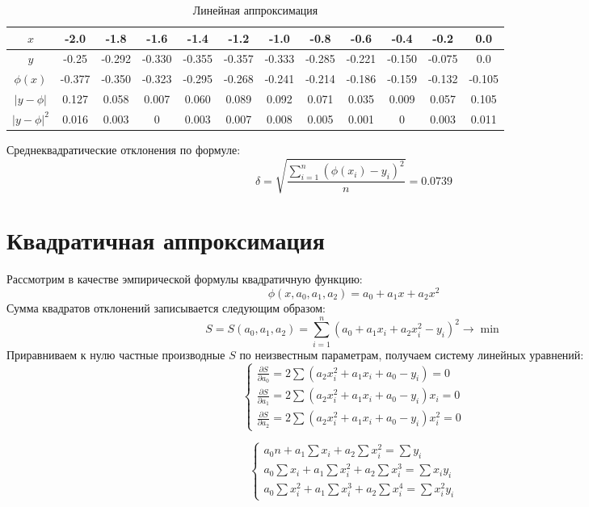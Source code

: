 \documentclass{article}
\begin{document}
\begin{center}
    \begin{table}[H]
        \centering
        \begin{tabular}{|c|c|c|c|c|c|c|c|c|c|c|c|}
            \hline
            \( x \) & -2.0 & -1.8 & -1.6 & -1.4 & -1.2 & -1.0 & -0.8 & -0.6 & -0.4 & -0.2 & 0.0 \\
            \hline
            \( y\) & -0.25 & -0.292 & -0.330 & -0.355 & -0.357 & -0.333 & -0.285 & -0.221 & -0.150 & -0.075 & 0.0 \\
            \hline
            \(\phi(x)\) & -0.377 & -0.350 & -0.323 & -0.295 & -0.268 & -0.241 & -0.214 & -0.186 & -0.159 & -0.132 & -0.105 \\
            \hline
            \(|y-\phi|\)& 0.127& 0.058& 0.007&0.060&0.089&0.092&0.071& 0.035&0.009& 0.057& 0.105\\
            \hline
            \(|y-\phi|^2\)& 0.016& 0.003& 0&0.003&0.007&0.008&0.005&0.001&0& 0.003& 0.011\\
            \hline
        \end{tabular}
        \caption{Линейная аппроксимация}
    \end{table}
\end{center}
Среднеквадратические отклонения по формуле:
\[\delta = \sqrt{\frac{\sum_{i=1}^{n}(\phi(x_i) - y_i)^2}{n}} = 0.0739\]

\section{Квадратичная аппроксимация}

Рассмотрим в качестве эмпирической формулы квадратичную функцию:
\[\phi(x, a_0, a_1, a_2) = a_0 + a_1 x + a_2 x^2\]
Сумма квадратов отклонений записывается следующим образом:
\[S = S(a_0, a_1, a_2) = \sum_{i=1}^{n} (a_0 + a_1 x_i + a_2 x_i^2 - y_i)^2 \rightarrow \min\]
Приравниваем к нулю частные производные \(S\) по неизвестным параметрам, получаем систему линейных уравнений:
\[
\begin{cases}
    \frac{\partial S}{\partial a_0} = 2 \sum (a_2 x_i^2 + a_1 x_i + a_0 - y_i) = 0 \\
    \frac{\partial S}{\partial a_1} = 2 \sum (a_2 x_i^2 + a_1 x_i + a_0 - y_i) x_i = 0 \\
    \frac{\partial S}{\partial a_2} = 2 \sum (a_2 x_i^2 + a_1 x_i + a_0 - y_i) x_i^2 = 0
\end{cases}
\]

\[
\begin{cases}
    a_0 n + a_1 \sum x_i + a_2 \sum x_i^2 = \sum y_i \\
    a_0 \sum x_i + a_1 \sum x_i^2 + a_2 \sum x_i^3 = \sum x_i y_i \\
    a_0 \sum x_i^2 + a_1 \sum x_i^3 + a_2 \sum x_i^4 = \sum x_i^2 y_i
\end{cases}
\]
\end{document}
